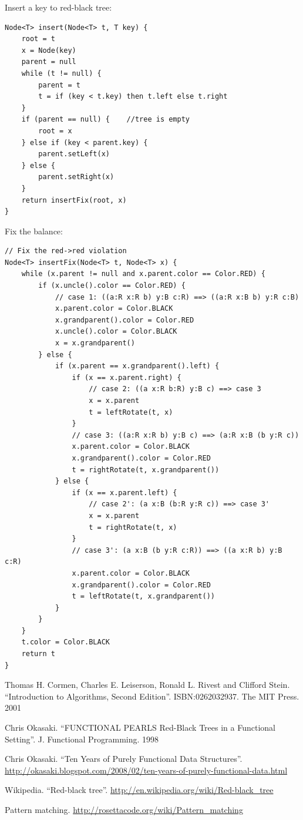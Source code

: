 \documentclass[b5paper]{article}
\begin{document}
Insert a key to red-black tree:

\begin{lstlisting}[language = Bourbaki]
Node<T> insert(Node<T> t, T key) {
    root = t
    x = Node(key)
    parent = null
    while (t != null) {
        parent = t
        t = if (key < t.key) then t.left else t.right
    }
    if (parent == null) {    //tree is empty
        root = x
    } else if (key < parent.key) {
        parent.setLeft(x)
    } else {
        parent.setRight(x)
    }
    return insertFix(root, x)
}
\end{lstlisting}

Fix the balance:

\begin{lstlisting}[language = Bourbaki]
// Fix the red->red violation
Node<T> insertFix(Node<T> t, Node<T> x) {
    while (x.parent != null and x.parent.color == Color.RED) {
        if (x.uncle().color == Color.RED) {
            // case 1: ((a:R x:R b) y:B c:R) ==> ((a:R x:B b) y:R c:B)
            x.parent.color = Color.BLACK
            x.grandparent().color = Color.RED
            x.uncle().color = Color.BLACK
            x = x.grandparent()
        } else {
            if (x.parent == x.grandparent().left) {
                if (x == x.parent.right) {
                    // case 2: ((a x:R b:R) y:B c) ==> case 3
                    x = x.parent
                    t = leftRotate(t, x)
                }
                // case 3: ((a:R x:R b) y:B c) ==> (a:R x:B (b y:R c))
                x.parent.color = Color.BLACK
                x.grandparent().color = Color.RED
                t = rightRotate(t, x.grandparent())
            } else {
                if (x == x.parent.left) {
                    // case 2': (a x:B (b:R y:R c)) ==> case 3'
                    x = x.parent
                    t = rightRotate(t, x)
                }
                // case 3': (a x:B (b y:R c:R)) ==> ((a x:R b) y:B c:R)
                x.parent.color = Color.BLACK
                x.grandparent().color = Color.RED
                t = leftRotate(t, x.grandparent())
            }
        }
    }
    t.color = Color.BLACK
    return t
}
\end{lstlisting}

\begin{thebibliography}{99}

Thomas H. Cormen, Charles E. Leiserson, Ronald L. Rivest and Clifford Stein.
``Introduction to Algorithms, Second Edition''. ISBN:0262032937. The MIT Press. 2001

Chris Okasaki. ``FUNCTIONAL PEARLS Red-Black Trees in a Functional Setting''. J. Functional Programming. 1998

Chris Okasaki. ``Ten Years of Purely Functional Data Structures''. \url{http://okasaki.blogspot.com/2008/02/ten-years-of-purely-functional-data.html}

Wikipedia. ``Red-black tree''. \url{http://en.wikipedia.org/wiki/Red-black\_tree}

Pattern matching. \url{http://rosettacode.org/wiki/Pattern\_matching}

\end{thebibliography}

\ifx\wholebook\relax\else
\end{document}
